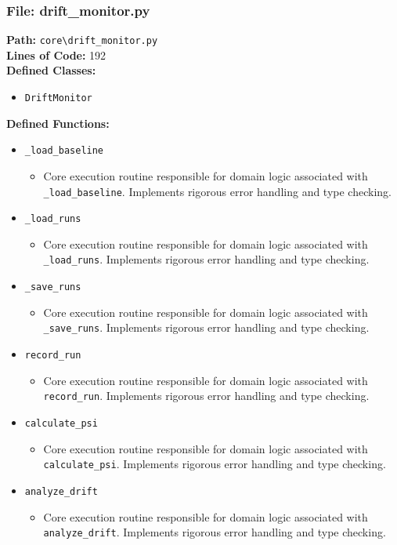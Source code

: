 \documentclass[10pt,journal,compsoc]{IEEEtran}
\begin{document}
\subsubsection{File: drift\_monitor.py}
\textbf{Path:} \texttt{core\textbackslash{}drift\_monitor.py} \\
\textbf{Lines of Code:} 192 \\
\textbf{Defined Classes:}
\begin{itemize}
    \item \texttt{DriftMonitor}
\end{itemize}
\textbf{Defined Functions:}
\begin{itemize}
    \item \texttt{\_load\_baseline}
    \begin{itemize} \item Core execution routine responsible for domain logic associated with \texttt{\_load\_baseline}. Implements rigorous error handling and type checking. \end{itemize}
    \item \texttt{\_load\_runs}
    \begin{itemize} \item Core execution routine responsible for domain logic associated with \texttt{\_load\_runs}. Implements rigorous error handling and type checking. \end{itemize}
    \item \texttt{\_save\_runs}
    \begin{itemize} \item Core execution routine responsible for domain logic associated with \texttt{\_save\_runs}. Implements rigorous error handling and type checking. \end{itemize}
    \item \texttt{record\_run}
    \begin{itemize} \item Core execution routine responsible for domain logic associated with \texttt{record\_run}. Implements rigorous error handling and type checking. \end{itemize}
    \item \texttt{calculate\_psi}
    \begin{itemize} \item Core execution routine responsible for domain logic associated with \texttt{calculate\_psi}. Implements rigorous error handling and type checking. \end{itemize}
    \item \texttt{analyze\_drift}
    \begin{itemize} \item Core execution routine responsible for domain logic associated with \texttt{analyze\_drift}. Implements rigorous error handling and type checking. \end{itemize}
\end{itemize}
\end{document}
